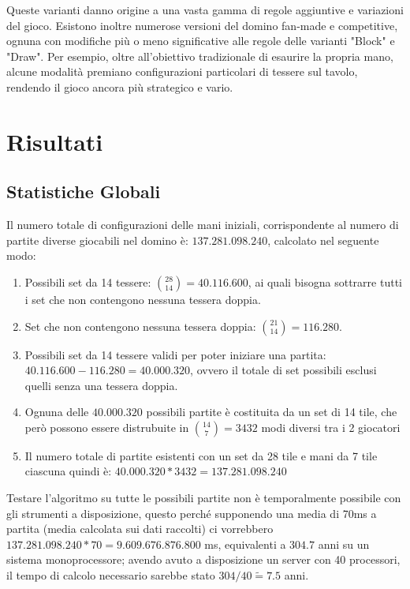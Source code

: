 \documentclass[a4paper,12pt]{report} %
\begin{document}
Queste varianti danno origine a una vasta gamma di regole aggiuntive e variazioni del gioco. Esistono inoltre numerose versioni del domino fan-made e competitive, ognuna con modifiche più o meno significative alle regole delle varianti "Block" e "Draw". Per esempio, oltre all’obiettivo tradizionale di esaurire la propria mano, alcune modalità premiano configurazioni particolari di tessere sul tavolo, rendendo il gioco ancora più strategico e vario.


\chapter{Risultati}

\section{Statistiche Globali}

Il numero totale di configurazioni delle mani iniziali, corrispondente al numero di partite diverse giocabili nel domino è: \(137.281.098.240\), calcolato nel seguente modo:


\begin{enumerate}
    \item Possibili set da 14 tessere: \(\binom{28}{14} = 40.116.600\), ai quali bisogna sottrarre tutti i set che non contengono nessuna tessera doppia.
    \item Set che non contengono nessuna tessera doppia: \(\binom{21}{14} = 116.280\).
    \item Possibili set da 14 tessere validi per poter iniziare una partita: \(40.116.600 - 116.280 = 40.000.320\), ovvero il totale di set possibili esclusi quelli senza una tessera doppia.
    \item Ognuna delle \(40.000.320\) possibili partite è costituita da un set di 14 tile, che però possono essere distrubuite in \(\binom{14}{7} = 3432\) modi diversi tra i 2 giocatori
    \item Il numero totale di partite esistenti con un set da 28 tile e mani da 7 tile ciascuna quindi è: \(40.000.320 * 3432 = 137.281.098.240\)
\end{enumerate}

Testare l'algoritmo su tutte le possibili partite non è temporalmente possibile con gli strumenti a disposizione, questo perché supponendo una media di 70ms a partita (media calcolata sui dati raccolti) ci vorrebbero \(137.281.098.240 * 70  = 9.609.676.876.800\) ms, equivalenti a \(304.7\) anni su un sistema monoprocessore; avendo avuto a disposizione un server con 40 processori, il tempo di calcolo necessario sarebbe stato \(304 / 40 \tilde= 7.5\) anni. 
\end{document}
